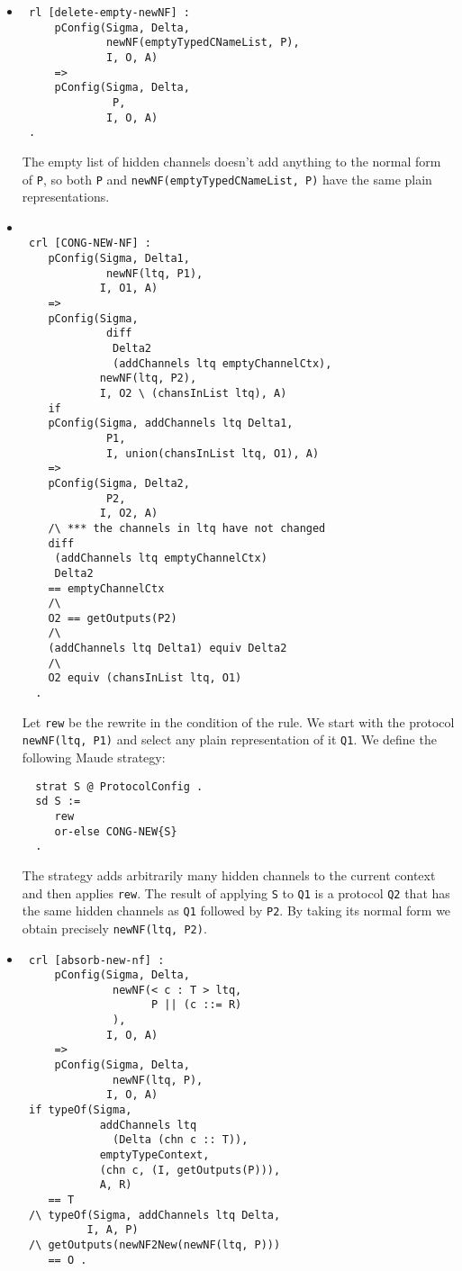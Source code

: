 \documentclass{article}
\begin{document}
\begin{itemize}

\item[delete-empty-newNF]
 \begin{lstlisting}
 rl [delete-empty-newNF] :
     pConfig(Sigma, Delta, 
             newNF(emptyTypedCNameList, P), 
             I, O, A)
     => 
     pConfig(Sigma, Delta, 
              P, 
             I, O, A) 
 . 
  \end{lstlisting}
  
  The empty list of hidden channels doesn't add anything to the normal form
  of \verb+P+, so both \verb+P+ and \verb+newNF(emptyTypedCNameList, P)+ have
  the same plain representations.

\item[CONG-NEW-NF]
 \begin{lstlisting}
 
 crl [CONG-NEW-NF] : 
    pConfig(Sigma, Delta1, 
             newNF(ltq, P1), 
            I, O1, A) 
    => 
    pConfig(Sigma, 
             diff 
              Delta2 
              (addChannels ltq emptyChannelCtx), 
            newNF(ltq, P2), 
            I, O2 \ (chansInList ltq), A)
    if
    pConfig(Sigma, addChannels ltq Delta1, 
             P1, 
             I, union(chansInList ltq, O1), A)
    =>
    pConfig(Sigma, Delta2, 
             P2, 
            I, O2, A) 
    /\ *** the channels in ltq have not changed
    diff 
     (addChannels ltq emptyChannelCtx) 
     Delta2 
    == emptyChannelCtx
    /\
    O2 == getOutputs(P2)
    /\ 
    (addChannels ltq Delta1) equiv Delta2 
    /\ 
    O2 equiv (chansInList ltq, O1)
  .
 \end{lstlisting}
 
 Let \verb+rew+ be the rewrite in the condition of the rule. 
 We start with the protocol \verb+newNF(ltq, P1)+ and select any 
 plain representation of it \verb+Q1+.
 We define the following Maude strategy:
 \begin{lstlisting}
  strat S @ ProtocolConfig .
  sd S :=
     rew
     or-else CONG-NEW{S}
  .
 \end{lstlisting}
 The strategy adds arbitrarily many hidden channels to the current context
 and then applies \verb+rew+. The result of applying \verb+S+ to \verb+Q1+
 is a protocol \verb+Q2+ that has the same hidden channels as \verb+Q1+ followed
 by \verb+P2+. By taking its normal form we obtain precisely 
 \verb+newNF(ltq, P2)+.

\item[absorb-new-nf]
 \begin{lstlisting}
 crl [absorb-new-nf] :
     pConfig(Sigma, Delta, 
              newNF(< c : T > ltq, 
                    P || (c ::= R)
              ), 
             I, O, A) 
     => 
     pConfig(Sigma, Delta, 
              newNF(ltq, P), 
             I, O, A) 
 if typeOf(Sigma, 
            addChannels ltq 
              (Delta (chn c :: T)), 
            emptyTypeContext, 
            (chn c, (I, getOutputs(P))), 
            A, R) 
    == T 
 /\ typeOf(Sigma, addChannels ltq Delta, 
          I, A, P)       
 /\ getOutputs(newNF2New(newNF(ltq, P))) 
    == O .
    \end{lstlisting}


\end{itemize}
\end{document}
